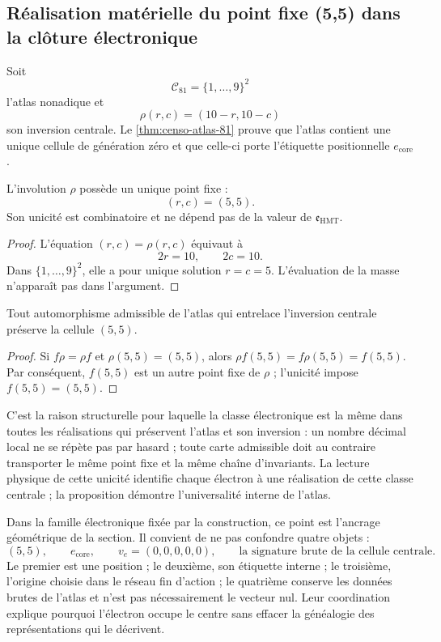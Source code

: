 \subsection{Réalisation matérielle du point fixe (5,5) dans la clôture électronique}

Soit
\[
 \mathcal C_{81}=\{1,\ldots,9\}^2
\]
l'atlas nonadique et
\[
 \rho(r,c)=(10-r,10-c)
\]
son inversion centrale. Le \cref{thm:censo-atlas-81} prouve que l'atlas
contient une unique cellule de génération zéro et que celle-ci porte l'étiquette
positionnelle \(e_{\mathrm{core}}\).

\begin{proposition}
\label{prop:centro-electron-rev6}
L'involution \(\rho\) possède un unique point fixe :
\[
 \boxed{(r,c)=(5,5).}
\]
Son unicité est combinatoire et ne dépend pas de la valeur de
\(\mathfrak e_{\mathrm{HMT}}\).
\end{proposition}

\begin{proof}
L'équation \((r,c)=\rho(r,c)\) équivaut à
\[
 2r=10,\qquad2c=10.
\]
Dans \(\{1,\ldots,9\}^2\), elle a pour unique solution \(r=c=5\). L'évaluation
de la masse n'apparaît pas dans l'argument.
\end{proof}

\begin{corollary}
\label{cor:universalidad-electron-central-rev6}
Tout automorphisme admissible de l'atlas qui entrelace l'inversion centrale
préserve la cellule \((5,5)\).
\end{corollary}

\begin{proof}
Si \(f\rho=\rho f\) et \(\rho(5,5)=(5,5)\), alors
\(\rho f(5,5)=f\rho(5,5)=f(5,5)\). Par conséquent, \(f(5,5)\) est un autre point fixe
de \(\rho\) ; l'unicité impose \(f(5,5)=(5,5)\).
\end{proof}

C'est la raison structurelle pour laquelle la classe électronique est la même dans
toutes les réalisations qui préservent l'atlas et son inversion : un nombre décimal local ne se répète pas
par hasard ; toute carte admissible doit au contraire
transporter le même point fixe et la même chaîne d'invariants. La lecture
physique de cette unicité identifie chaque électron à une réalisation de cette
classe centrale ; la proposition démontre l'universalité interne de l'atlas.

Dans la famille électronique fixée par la construction, ce point est l'ancrage
géométrique de la section. Il convient de ne pas confondre quatre objets :
\[
 (5,5),\qquad
 e_{\mathrm{core}},\qquad
 v_e=(0,0,0,0,0),\qquad
 \text{la signature brute de la cellule centrale}.
\]
Le premier est une position ; le deuxième, son étiquette interne ; le troisième,
l'origine choisie dans le réseau fin d'action ; le quatrième conserve les
données brutes de l'atlas et n'est pas nécessairement le vecteur nul. Leur
coordination explique pourquoi l'électron occupe le centre sans effacer la
généalogie des représentations qui le décrivent.

